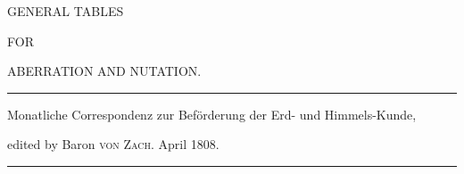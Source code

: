 \clearpage{}%
\thispagestyle{empty}
\begin{center}
\vspace*{1.4in}
{\Large GENERAL TABLES\par}
\vspace{.5in}
{\large FOR\par}
\vspace{.5in}
{\Large ABERRATION AND NUTATION.\par}
\vfill
\hrule\medskip
{\small Monatliche Correspondenz zur Beförderung der Erd- und Himmels-Kunde,\par
edited by Baron \textsc{von Zach}. April 1808.\par}
\medskip\hrule
\end{center}
\clearpage
{}%
